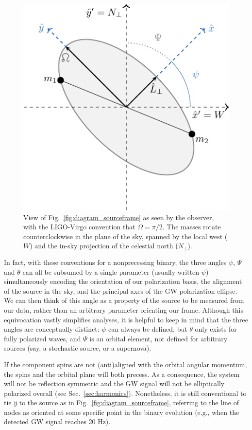 \documentclass[aps,prd,twocolumn,superscriptaddress,preprintnumbers,floatfix,nofootinbib]{revtex4-2}
\begin{document}
\begin{figure}
\includegraphics[width=0.8\columnwidth]{diagram_skyview.pdf}
\caption{View of Fig.~\ref{fig:diagram_sourceframe} as seen by the observer, with the LIGO-Virgo convention that $\Omega=\pi/2$. The masses rotate counterclockwise in the plane of the sky, spanned by the local west ($W$) and the in-sky projection of the celestial north ($N_\perp$).
}
\label{fig:diagram_skyview}
\end{figure}

In fact, with these conventions for a nonprecessing binary, the three angles $\psi$, $\Psi$ and $\theta$ can all be subsumed by a single parameter (usually written $\psi$) simultaneously encoding the orientation of our polarization basis, the alignment of the source in the sky, and the principal axes of the GW polarization ellipse.
We can then think of this angle as a property of the source to be measured from our data, rather than an arbitrary parameter orienting our frame.
Although this equivocation vastly simplifies analyses, it is helpful to keep in mind that the three angles are conceptually distinct: $\psi$ can always be defined, but $\theta$ only exists for fully polarized waves, and $\Psi$ is an orbital element, not defined for arbitrary sources (say, a stochastic source, or a supernova).

If the component spins are not (anti)aligned with the orbital angular momentum, the spins and the orbital plane will both precess.
As a consequence, the system will not be reflection symmetric and the GW signal will not be elliptically polarized overall (see Sec.~\ref{sec:harmonics}).
Nonetheless, it is still conventional to tie $\hat{y}$ to the source as in Fig.~\ref{fig:diagram_sourceframe}, referring to the line of nodes as oriented at some specific point in the binary evolution (e.g., when the detected GW signal reaches 20 Hz).
\end{document}
